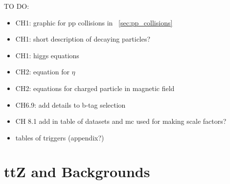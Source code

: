 \documentclass[12pt,chapterheads,oneside]{ucsd}
\begin{document}
\graphicspath{
{Figs/}
}



TO DO:\\
\begin{itemize}
\item CH1: graphic for pp collisions in ~\ref{sec:pp_collisions}
\item CH1: short description of decaying particles?
\item CH1: higgs equations
\item CH2: equation for $\eta$
\item CH2: equations for charged particle in magnetic field\\
\item CH6.9: add details to b-tag selection\\
\item CH 8.1 add in table of datasets and mc used for making scale factors?
\item tables of triggers (appendix?)
\end{itemize}








\chapter{ttZ and Backgrounds}
	
	



	








   






\appendix
\end{document}
